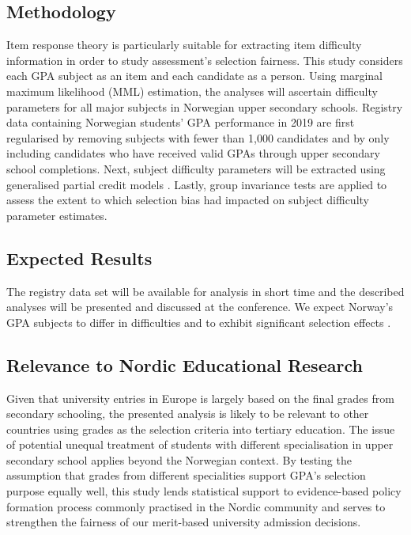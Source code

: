 \subsection{Methodology}

Item response theory is particularly suitable for extracting item difficulty information in order to study assessment's selection fairness. This study considers each GPA subject as an item and each candidate as a person. Using marginal maximum likelihood (MML) estimation, the analyses will ascertain difficulty parameters for all major subjects in Norwegian upper secondary schools. Registry data containing Norwegian students' GPA performance in 2019 are first regularised by removing subjects with fewer than 1,000 candidates and by only including candidates who have received valid GPAs through upper secondary school completions. Next, subject difficulty parameters will be extracted using generalised partial credit models \parencite[GPCM,][]{muraki:1992}. Lastly, group invariance tests are applied to assess the extent to which selection bias had impacted on subject difficulty parameter estimates.

\subsection{Expected Results}

The registry data set will be available for analysis in short time and the described analyses will be presented and discussed at the conference. We expect Norway's GPA subjects to differ in difficulties \parencite{he:2018} and to exhibit significant selection effects \parencite{korobko:2008}.

\subsection{Relevance to Nordic Educational Research}

Given that university entries in Europe is largely based on the final grades from secondary schooling, the presented analysis is likely to be relevant to other countries using grades as the selection criteria into tertiary education. The issue of potential unequal treatment of students with different specialisation in upper secondary school applies beyond the Norwegian context. By testing the assumption that grades from different specialities support GPA's selection purpose equally well, this study lends statistical support to evidence-based policy formation process commonly practised in the Nordic community and serves to strengthen the fairness of our merit-based university admission decisions.
